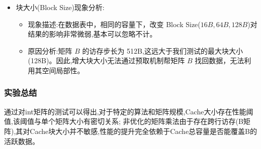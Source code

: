 \begin{itemize}
\begin{itemize}
\begin{itemize}
\begin{itemize}
                \item 数据容纳:$64KB$正好等于一个int型矩阵$(128 \times 128 \times 4)$的大小。当 Cache 容量达到 64KB 时,系统恰好能够完整地缓存下矩阵 $A$ 或矩阵 $B$ 的绝大部分活跃数据。
                \item 循环间访存失效消除:此时,在内层循环中被加载的 $B$ 矩阵块可以驻留在 Cache 中供后续循环使用。这种从“无法容纳”到“完全容纳”的改变，消除了绝大部分的重复容量失效，导致了命中率的断崖式上升。
            \end{itemize}
        \end{itemize}
        \item 饱和稳定阶段($64KB\sim 128KB$)
        \begin{itemize}
            \item 现象描述:命中率进一步小幅度提升并最终稳定在$99.8\%$ 左右。
            \item 原因分析:
            \begin{itemize}
                \item 数据完全容纳:当容量达到 128KB 时，已非常接近总数据量($192KB$)的量级。此时除了最初加载数据产生的不可避免的冷启动失效 (Cold Miss) 外,几乎所有的Cache Miss都消失了。
                \item 边际效益递减：由于核心数据集已被完全容纳,继续增加容量对命中率的提升空间极小,性能达到硬件优化上限。
            \end{itemize}
        \end{itemize}
    \end{itemize}
    \item 块大小(Block Size)现象分析:
    \begin{itemize}
        \item 现象描述:在数据表中，相同的容量下，改变 Block Size($16B, 64B, 128B$)对结果的影响非常微弱,基本可以忽略不计。
        \item 原因分析:矩阵 $B$ 的访存步长为 512B,这远大于我们测试的最大块大小(128B)。因此,增大块大小无法通过预取机制帮矩阵 $B$ 找回数据，无法利用其空间局部性。
    \end{itemize}
\end{itemize}

\subsubsection{实验总结}
通过对int矩阵的测试可以得出,对于特定的算法和矩阵规模,Cache大小存在性能阈值,该阈值与单个矩阵大小有密切关系;
非优化的矩阵乘法由于存在跨行访存(B矩阵),其对Cache块大小并不敏感,性能的提升完全依赖于Cache总容量是否能覆盖B的活跃数据。